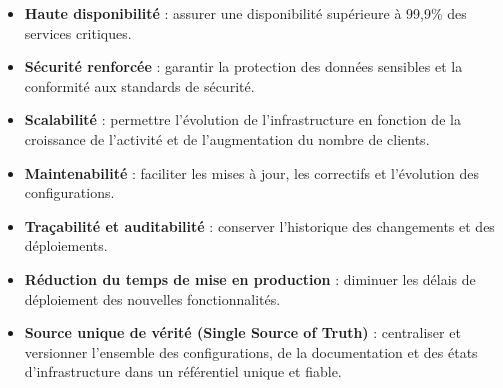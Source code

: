 \begin{itemize}
    \item \textbf{Haute disponibilité} : assurer une disponibilité supérieure à 99,9\% des services critiques.
    \item \textbf{Sécurité renforcée} : garantir la protection des données sensibles et la conformité aux standards de sécurité.
    \item \textbf{Scalabilité} : permettre l'évolution de l'infrastructure en fonction de la croissance de l'activité et de l'augmentation du nombre de clients.
    \item \textbf{Maintenabilité} : faciliter les mises à jour, les correctifs et l'évolution des configurations.
    \item \textbf{Traçabilité et auditabilité} : conserver l'historique des changements et des déploiements.
    \item \textbf{Réduction du temps de mise en production} : diminuer les délais de déploiement des nouvelles fonctionnalités.
    \item \textbf{Source unique de vérité (Single Source of Truth)} : centraliser et versionner l’ensemble des configurations, de la documentation et des états d’infrastructure dans un référentiel unique et fiable.
\end{itemize}
